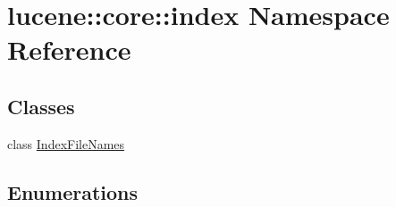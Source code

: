 \hypertarget{namespacelucene_1_1core_1_1index}{}\section{lucene\+:\+:core\+:\+:index Namespace Reference}
\label{namespacelucene_1_1core_1_1index}
\subsection*{Classes}
\begin{DoxyCompactItemize}
\item 
class \mbox{\hyperlink{classlucene_1_1core_1_1index_1_1IndexFileNames}{Index\+File\+Names}}
\end{DoxyCompactItemize}
\subsection*{Enumerations}
